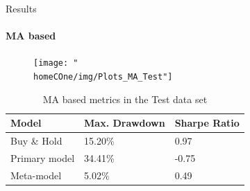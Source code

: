 \documentclass[usenames,dvipsnames]{beamer} %
\newcommand{\homeCOne}{../../Chapter 1 - Metalabeling/Draft}
\begin{document}
\begin{frame}{Results}
\framesubtitle{MA based}

	\vspace{-.1cm}
	\begin{figure}
		\centering
		\texttt{[image: "\\homeCOne/img/Plots\_MA\_Test"]}
	\end{figure}
	
	\vspace{-.35cm}
%
%	
	
	\begin{table}[htbp]
		\scriptsize
		\centering
		\caption{MA based metrics in the Test data set}
		\vspace{-.2cm}
		\begin{tabular}{ |C{2cm}|C{2.5cm}|C{2cm}| }
			\hline
			Model 			& Max. Drawdown & Sharpe Ratio\\
			\hline
			 Buy \& Hold &  15.20\% &
			 0.97\\ 
			 Primary model & 
			 34.41\% &
			 -0.75\\ 
			 Meta-model &  
			5.02\% &
			 0.49\\ 
			\hline
		\end{tabular}
	\end{table}
	


\end{frame}
\end{document}
